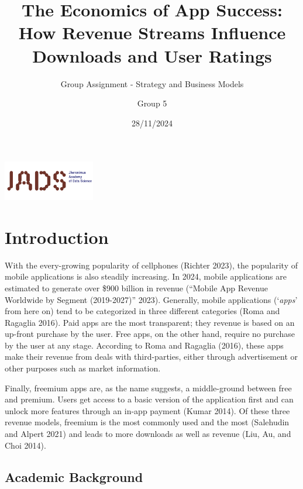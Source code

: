 \documentclass[
  12pt,
  a4paper,
]{article}
\title{\textbf{The Economics of App Success: How Revenue Streams
Influence Downloads and User Ratings}}
\subtitle{Group Assignment - Strategy and Business Models}
\author{Group 5}
\date{28/11/2024}
\renewcommand*\contentsname{Table of contents}
\newcommand\contentsname{Table of contents}
\begin{document}
\maketitle

\vspace{2em}
\begin{center}
  \includegraphics[width=0.3\textwidth]{figures/jads.png}
\end{center}
\vspace{3em}
\newpage

\renewcommand*\contentsname{Contents}
{
\hypersetup{linkcolor=}
\setcounter{tocdepth}{3}
\tableofcontents
}

\newpage

\section{\texorpdfstring{Introduction
}{Introduction }}\label{introduction}

With the every-growing popularity of cellphones (Richter 2023), the
popularity of mobile applications is also steadily increasing. In 2024,
mobile applications are estimated to generate over \$900 billion in
revenue ({``Mobile App Revenue Worldwide by Segment (2019-2027)''}
2023). Generally, mobile applications (`\emph{apps}' from here on) tend
to be categorized in three different categories (Roma and Ragaglia
2016). Paid apps are the most transparent; they revenue is based on an
up-front purchase by the user. Free apps, on the other hand, require no
purchase by the user at any stage. According to Roma and Ragaglia
(2016), these apps make their revenue from deals with third-parties,
either through advertisement or other purposes such as market
information.

Finally, freemium apps are, as the name suggests, a middle-ground
between free and premium. Users get access to a basic version of the
application first and can unlock more features through an in-app payment
(Kumar 2014). Of these three revenue models, freemium is the most
commonly used and the most (Salehudin and Alpert 2021) and leads to more
downloads as well as revenue (Liu, Au, and Choi 2014).

\subsection{Academic Background}\label{academic-background}
\end{document}
